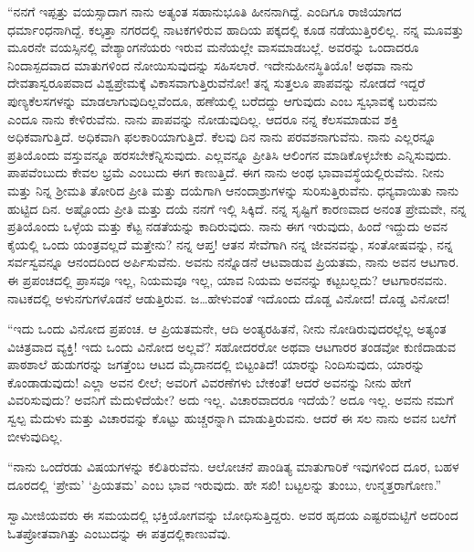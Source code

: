  “ನನಗೆ ಇಪ್ಪತ್ತು ವಯಸ್ಸಾದಾಗ ನಾನು ಅತ್ಯಂತ ಸಹಾನುಭೂತಿ ಹೀನನಾಗಿದ್ದೆ. ಎಂದಿಗೂ ರಾಜಿಯಾಗದ ಧರ್ಮಾಂಧನಾಗಿದ್ದೆ. ಕಲ್ಕತ್ತಾ ನಗರದಲ್ಲಿ ನಾಟಕಗಳಿರುವ ಹಾದಿಯ ಪಕ್ಕದಲ್ಲಿ ಕೂಡ ನಡೆಯುತ್ತಿರಲಿಲ್ಲ. ನನ್ನ ಮೂವತ್ತು ಮೂರನೇ ವಯಸ್ಸಿನಲ್ಲಿ ವೇಶ್ಯಾಂಗನೆಯರು ಇರುವ ಮನೆಯಲ್ಲೇ ವಾಸಮಾಡಬಲ್ಲೆ. ಅವರನ್ನು ಒಂದಾದರೂ ನಿಂದಾಸ್ಪದವಾದ ಮಾತುಗಳಿಂದ ನೋಯಿಸುವುದನ್ನು ಸಹಿಸಲಾರೆ. ಇದೇನು\break ಹೀನಸ್ಥಿತಿಯೊ! ಅಥವಾ ನಾನು ದೇವತಾಸ್ವರೂಪವಾದ ವಿಶ್ವಪ್ರೇಮಕ್ಕೆ ವಿಕಾಸವಾಗುತ್ತಿರು\-ವೆನೋ! ತನ್ನ ಸುತ್ತಲೂ ಪಾಪವನ್ನು ನೋಡದೆ ಇದ್ದರೆ ಪುಣ್ಯಕೆಲಸಗಳನ್ನು ಮಾಡಲಾಗುವುದಿಲ್ಲವೆಂದೂ, ಹಣೆಯಲ್ಲಿ ಬರೆದದ್ದು ಆಗುವುದು ಎಂಬ ಸ್ವಭಾವಕ್ಕೆ ಬರುವನು ಎಂದೂ ನಾನು ಕೇಳಿರುವೆನು. ನಾನು ಪಾಪವನ್ನು ನೋಡುವುದಿಲ್ಲ. ಆದರೂ ನನ್ನ ಕೆಲಸಮಾಡುವ ಶಕ್ತಿ ಅಧಿಕವಾಗುತ್ತಿದೆ. ಅಧಿಕವಾಗಿ ಫಲಕಾರಿಯಾಗುತ್ತಿದೆ. ಕೆಲವು ದಿನ ನಾನು ಪರವಶನಾಗುವೆನು. ನಾನು ಎಲ್ಲರನ್ನೂ ಪ್ರತಿಯೊಂದು ವಸ್ತುವನ್ನೂ ಹರಸಬೇಕೆನ್ನಿಸುವುದು. ಎಲ್ಲವನ್ನೂ ಪ್ರೀತಿಸಿ ಆಲಿಂಗನ ಮಾಡಿಕೊಳ್ಳಬೇಕು ಎನ್ನಿಸುವುದು. ಪಾಪವೆಂಬುದು ಕೇವಲ ಭ್ರಮೆ ಎಂಬುದು ಈಗ ಕಾಣುತ್ತಿದೆ. ಈಗ ನಾನು ಅಂಥ ಭಾವಾವಸ್ಥೆಯಲ್ಲಿರುವೆನು. ನೀನು ಮತ್ತು ನಿನ್ನ ಶ‍್ರೀಮತಿ ತೋರಿದ ಪ್ರೀತಿ ಮತ್ತು ದಯೆಗಾಗಿ ಆನಂದಾಶ್ರುಗಳನ್ನು ಸುರಿಸುತ್ತಿರುವೆನು. ಧನ್ಯವಾಯಿತು ನಾನು ಹುಟ್ಟಿದ ದಿನ. ಅಷ್ಟೊಂದು ಪ್ರೀತಿ ಮತ್ತು ದಯೆ ನನಗೆ ಇಲ್ಲಿ ಸಿಕ್ಕಿದೆ. ನನ್ನ ಸೃಷ್ಟಿಗೆ ಕಾರಣವಾದ ಅನಂತ ಪ್ರೇಮವೇ, ನನ್ನ ಪ್ರತಿಯೊಂದು ಒಳ್ಳೆಯ ಮತ್ತು ಕೆಟ್ಟ ನಡತೆಯನ್ನು ಕಾದಿರುವುದು. ನಾನು ಈಗ ಇರುವುದು, ಹಿಂದೆ ಇದ್ದುದು ಅವನ ಕೈಯಲ್ಲಿ ಒಂದು ಯಂತ್ರವಲ್ಲದೆ ಮತ್ತೇನು? ನನ್ನ ಆಪ್ತ! ಆತನ ಸೇವೆಗಾಗಿ ನನ್ನ ಜೀವನವನ್ನು, ಸಂತೋಷವನ್ನು, ನನ್ನ ಸರ್ವಸ್ವವನ್ನೂ ಆನಂದದಿಂದ ಅರ್ಪಿಸುವೆನು. ಅವನು ನನ್ನೊಡನೆ ಆಟವಾಡುವ ಪ್ರಿಯತಮ, ನಾನು ಅವನ ಆಟಗಾರ. ಈ ಪ್ರಪಂಚದಲ್ಲಿ ಪ್ರಾಸವೂ ಇಲ್ಲ, ನಿಯಮವೂ ಇಲ್ಲ, ಯಾವ ನಿಯಮ ಅವನನ್ನು ಕಟ್ಟಬಲ್ಲದು? ಆಟಗಾರನವನು. ನಾಟಕದಲ್ಲಿ ಅಳುನಗುಗಳೊಡನೆ ಆಡುತ್ತಿರುವ. ಜ…ಹೇಳುವಂತೆ ಇದೊಂದು ದೊಡ್ಡ ವಿನೋದ! ದೊಡ್ಡ ವಿನೋದ! 

\newpage

 “ಇದು ಒಂದು ವಿನೋದ ಪ್ರಪಂಚ. ಆ ಪ್ರಿಯತಮನೇ, ಆದಿ ಅಂತ್ಯರಹಿತನೆ, ನೀನು ನೋಡಿರುವುದರಲ್ಲೆಲ್ಲ ಅತ್ಯಂತ ವಿಚಿತ್ರವಾದ ವ್ಯಕ್ತಿ! ಇದು ಒಂದು ವಿನೋದ ಅಲ್ಲವೆ? ಸಹೋದರರೋ ಅಥವಾ ಆಟಗಾರರ ತಂಡವೋ ಕುಣಿದಾಡುವ ಪಾಠಶಾಲೆ ಹುಡುಗರನ್ನು ಜಗತ್ತೆಂಬ ಆಟದ ಮೈದಾನದಲ್ಲಿ ಬಿಟ್ಟಂತಿದೆ! ಯಾರನ್ನು ನಿಂದಿಸುವುದು, ಯಾರನ್ನು ಕೊಂಡಾಡುವುದು! ಎಲ್ಲಾ ಅವನ ಲೀಲೆ; ಅವರಿಗೆ ವಿವರಣೆಗಳು ಬೇಕಂತೆ! ಆದರೆ ಅವನನ್ನು ನೀನು ಹೇಗೆ ವಿವರಿಸುವುದು? ಅವನಿಗೆ ಮೆದುಳಿದೆಯೇ? ಅದು ಇಲ್ಲ. ವಿಚಾರವಾದರೂ ಇದೆಯೆ? ಅದೂ ಇಲ್ಲ. ಅವನು ನಮಗೆ ಸ್ವಲ್ಪ ಮೆದುಳು ಮತ್ತು ವಿಚಾರವನ್ನು ಕೊಟ್ಟು ಹುಚ್ಚರನ್ನಾಗಿ ಮಾಡುತ್ತಿರುವನು. ಆದರೆ ಈ ಸಲ ನಾನು ಅವನ ಬಲೆಗೆ ಬೀಳುವುದಿಲ್ಲ.

 “ನಾನು ಒಂದೆರಡು ವಿಷಯಗಳನ್ನು ಕಲಿತಿರುವೆನು. ಆಲೋಚನೆ ಪಾಂಡಿತ್ಯ ಮಾತುಗಾರಿಕೆ ಇವುಗಳಿಂದ ದೂರ, ಬಹಳ ದೂರದಲ್ಲಿ ‘ಪ್ರೇಮ’ ‘ಪ್ರಿಯತಮ’ ಎಂಬ ಭಾವ ಇರುವುದು. ಹೇ ಸಖಿ! ಬಟ್ಟಲನ್ನು ತುಂಬು, ಉನ್ಮತ್ತರಾಗೋಣ.” 

 ಸ್ವಾಮೀಜಿಯವರು ಈ ಸಮಯದಲ್ಲಿ ಭಕ್ತಿಯೋಗವನ್ನು ಬೋಧಿಸುತ್ತಿದ್ದರು. ಅವರ ಹೃದಯ ಎಷ್ಟರಮಟ್ಟಿಗೆ ಅದರಿಂದ ಓತಪ್ರೋತವಾಗಿತ್ತು ಎಂಬುದನ್ನು ಈ ಪತ್ರದಲ್ಲಿ\break ಕಾಣುವೆವು. 

